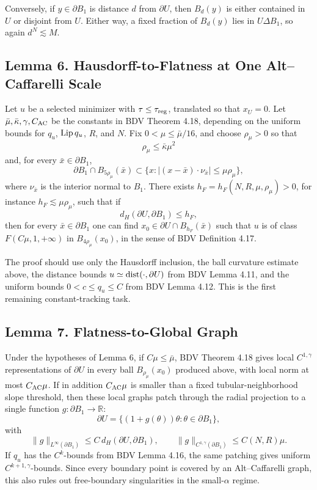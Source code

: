 \documentclass[11pt]{article}
\begin{document}
Conversely, if \(y\in\partial B_1\) is distance \(d\) from \(\partial U\), then
\(B_d(y)\) is either contained in \(U\) or disjoint from \(U\). Either way, a
fixed fraction of \(B_d(y)\) lies in \(U\Delta B_1\), so again
\(d^N\lesssim M\).

\subsection*{Lemma 6. Hausdorff-to-Flatness at One Alt--Caffarelli Scale}

Let \(u\) be a selected minimizer with \(\tau\le\tau_{\rm reg}\), translated so
that \(x_U=0\). Let
\(\bar\mu,\bar\kappa,\gamma,C_{\rm AC}\) be the constants in BDV Theorem 4.18,
depending on the uniform bounds for \(q_u\), \({\rm Lip}\,q_u\), \(R\), and
\(N\). Fix \(0<\mu\le\bar\mu/16\), and choose \(\rho_\mu>0\) so that
\[
\rho_\mu\le\bar\kappa\mu^2
\]
and, for every \(\bar x\in\partial B_1\),
\[
\partial B_1\cap B_{5\rho_\mu}(\bar x)
\subset
\{x: |(x-\bar x)\cdot\nu_{\bar x}|\le\mu\rho_\mu\},
\]
where \(\nu_{\bar x}\) is the interior normal to \(B_1\). There exists
\(h_F=h_F(N,R,\mu,\rho_\mu)>0\), for instance \(h_F\lesssim\mu\rho_\mu\),
such that if
\[
d_H(\partial U,\partial B_1)\le h_F,
\]
then for every \(\bar x\in\partial B_1\) one can find
\(x_0\in\partial U\cap B_{h_F}(\bar x)\) such that \(u\) is of class
\(F(C\mu,1,+\infty)\) in \(B_{4\rho_\mu}(x_0)\), in the sense of BDV
Definition 4.17.

The proof should use only the Hausdorff inclusion, the ball curvature estimate
above, the distance bounds \(u\simeq {\rm dist}(\cdot,\partial U)\) from BDV
Lemma 4.11, and the uniform bounds \(0<c\le q_u\le C\) from BDV Lemma 4.12.
This is the first remaining constant-tracking task.

\subsection*{Lemma 7. Flatness-to-Global Graph}

Under the hypotheses of Lemma 6, if \(C\mu\le\bar\mu\), BDV Theorem 4.18 gives
local \(C^{1,\gamma}\) representations of \(\partial U\) in every ball
\(B_{\rho_\mu}(x_0)\) produced above, with local norm at most
\(C_{\rm AC}\mu\). If in addition \(C_{\rm AC}\mu\) is smaller than a fixed
tubular-neighborhood slope threshold, then these local graphs patch through
the radial projection to a single function \(g:\partial B_1\to\mathbb R\):
\[
\partial U
=
\{(1+g(\theta))\theta:\theta\in\partial B_1\},
\]
with
\[
\|g\|_{L^\infty(\partial B_1)}
\le
C\,d_H(\partial U,\partial B_1),
\qquad
\|g\|_{C^{1,\gamma}(\partial B_1)}
\le
C(N,R)\mu.
\]
If \(q_u\) has the \(C^k\)-bounds from BDV Lemma 4.16, the same patching gives
uniform \(C^{k+1,\gamma}\)-bounds. Since every boundary point is covered by an
Alt--Caffarelli graph, this also rules out free-boundary singularities in the
small-\(\alpha\) regime.
\end{document}
